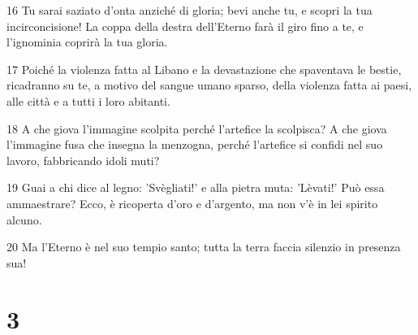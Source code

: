 \par 16 Tu sarai saziato d'onta anziché di gloria; bevi anche tu, e scopri la tua incirconcisione! La coppa della destra dell'Eterno farà il giro fino a te, e l'ignominia coprirà la tua gloria.
\par 17 Poiché la violenza fatta al Libano e la devastazione che spaventava le bestie, ricadranno su te, a motivo del sangue umano sparso, della violenza fatta ai paesi, alle città e a tutti i loro abitanti.
\par 18 A che giova l'immagine scolpita perché l'artefice la scolpisca? A che giova l'immagine fusa che insegna la menzogna, perché l'artefice si confidi nel suo lavoro, fabbricando idoli muti?
\par 19 Guai a chi dice al legno: 'Svègliati!' e alla pietra muta: 'Lèvati!' Può essa ammaestrare? Ecco, è ricoperta d'oro e d'argento, ma non v'è in lei spirito alcuno.
\par 20 Ma l'Eterno è nel suo tempio santo; tutta la terra faccia silenzio in presenza sua!

\chapter{3}

